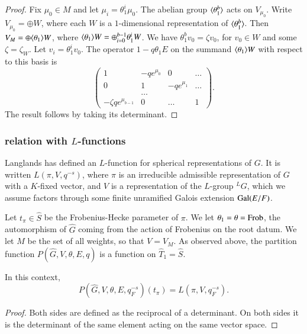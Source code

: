 \begin{proof}  Fix $\mu_0\in M$ and let $\mu_i = \theta_1^i \mu_0$.  The abelian group $\langle{\theta_1^b}\rangle$ acts on $V_{\mu_0}$.
Write $V_{\mu_0} = \oplus W$, where each $W$ is a $1$-dimensional representation of $\langle{\theta_1^b}\rangle$.
Then $V_M = \oplus \langle{\theta_1}\rangle W$, where $\langle{\theta_1}\rangle W = \oplus_{i=0}^{b-1} \theta_1^i W$.  We have $\theta_1^b v_0 = \zeta v_0$,
for $v_0\in W$ and some $\zeta = \zeta_W$.   Let $v_i = \theta_1^i v_0$.  
The operator $1 - q \theta_1 E$ on the summand $\langle{\theta_1}\rangle W$ with respect to this basis is
\[
\begin{pmatrix}
1 & -q e^{\mu_0} & 0 & \ldots\\
0 & 1 & -q e^{\mu_1} & \ldots\\
   & \ldots & & \\
-\zeta  q e^{\mu_{b-1}} & 0 & \ldots & 1
\end{pmatrix}.
\]
The result follows by taking its determinant.
\end{proof}

\subsubsection{relation with $L$-functions}

Langlands has defined an $L$-function for spherical representations of $G$.
It is written $L(\pi,V,q^{-s})$, where
 $\pi$ is an irreducible admissible representation of $G$ with a $K$-fixed vector, and
 $V$ is a representation of the $L$-group ${}^LG$, which we assume factors through some finite unramified Galois extension ${\operatorname{Gal}}(E/F)$.

Let $t_\pi\in \hat S$ be the Frobenius-Hecke parameter of  $\pi$.
We let $\theta_1 = \theta = {\operatorname{Frob}}$, the automorphism of $\hat G$ coming from the action of Frobenius on the root datum.
We let $M$ be the set of all weights, so that $V = V_M$.
As observed above, the partition function $P(\hat G,V,\theta,E,q)$ is a function on $\hat T_1 = \hat S$.

\begin{lemma} In this context,
\[
P(\hat G,V,\theta,E,q_F^{-s})(t_\pi) = L(\pi,V,q_F^{-s}).
\]
\end{lemma}

\begin{proof} Both sides are defined as the reciprocal of a determinant.  On both sides it is the determinant of the same
element acting on the same vector space.
\end{proof}


